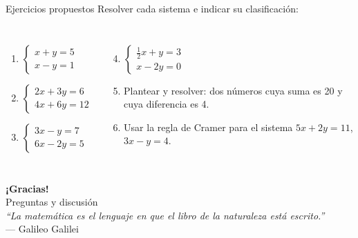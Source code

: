 \documentclass[11pt, aspectratio=169]{beamer}
\begin{document}
	\begin{frame}{Ejercicios propuestos}
		Resolver cada sistema e indicar su clasificación:
		
		\begin{columns}[T]
			\begin{enumerate}
				\item $\displaystyle\left\{\begin{array}{l} x + y = 5 \\ x - y = 1 \end{array}\right.$
				
				\vspace{0.8em}
				\item $\displaystyle\left\{\begin{array}{l} 2x + 3y = 6 \\ 4x + 6y = 12 \end{array}\right.$
				
				\vspace{0.8em}
				\item $\displaystyle\left\{\begin{array}{l} 3x - y = 7 \\ 6x - 2y = 5 \end{array}\right.$
			\end{enumerate}
			
			\begin{enumerate}
				\setcounter{enumi}{3}
				\item $\displaystyle\left\{\begin{array}{l} \tfrac{1}{2}x + y = 3 \\ x - 2y = 0 \end{array}\right.$
				
				\vspace{0.8em}
				\item Plantear y resolver: dos números cuya suma es 20 y cuya diferencia es 4.
				
				\vspace{0.8em}
				\item Usar la regla de Cramer para el sistema $5x + 2y = 11$, $3x - y = 4$.
			\end{enumerate}
		\end{columns}
	\end{frame}
	
	\begin{frame}[plain]
		\begin{center}
			{\Large\color{azuluni}\textbf{¡Gracias!}}\\[1em]
			{\normalsize Preguntas y discusión}\\[2em]
			\textit{``La matemática es el lenguaje en que el libro de la naturaleza está escrito.''}\\[0.3em]
			{\small — Galileo Galilei}
		\end{center}
	\end{frame}
	
\end{document}
